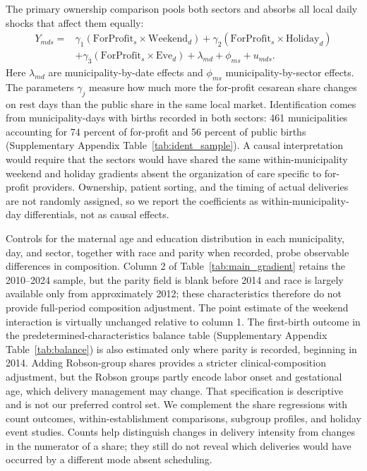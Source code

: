 \documentclass[12pt]{article}
\newcommand{\satab}[1]{Supplementary Appendix Table~\ref{#1}}
\begin{document}
The primary ownership comparison pools both sectors and absorbs all local daily shocks that affect them equally:
\begin{equation}
\begin{aligned}
Y_{mds}={}&\gamma_1(\mathrm{ForProfit}_s\times\mathrm{Weekend}_d)
+\gamma_2(\mathrm{ForProfit}_s\times\mathrm{Holiday}_d)\\
&+\gamma_3(\mathrm{ForProfit}_s\times\mathrm{Eve}_d)
+\lambda_{md}+\phi_{ms}+u_{mds}.
\end{aligned}
\label{eq:gradient}
\end{equation}
Here \(\lambda_{md}\) are municipality-by-date effects and \(\phi_{ms}\) municipality-by-sector effects. The parameters \(\gamma_j\) measure how much more the for-profit cesarean share changes on rest days than the public share in the same local market. Identification comes from municipality-days with births recorded in both sectors: 461 municipalities accounting for 74 percent of for-profit and 56 percent of public births (\satab{tab:ident_sample}). A causal interpretation would require that the sectors would have shared the same within-municipality weekend and holiday gradients absent the organization of care specific to for-profit providers. Ownership, patient sorting, and the timing of actual deliveries are not randomly assigned, so we report the coefficients as within-municipality-day differentials, not as causal effects.

Controls for the maternal age and education distribution in each municipality, day, and sector, together with race and parity when recorded, probe observable differences in composition. Column 2 of Table~\ref{tab:main_gradient} retains the 2010–2024 sample, but the parity field is blank before 2014 and race is largely available only from approximately 2012; these characteristics therefore do not provide full-period composition adjustment. The point estimate of the weekend interaction is virtually unchanged relative to column 1. The first-birth outcome in the predetermined-characteristics balance table (\satab{tab:balance}) is also estimated only where parity is recorded, beginning in 2014. Adding Robson-group shares provides a stricter clinical-composition adjustment, but the Robson groups partly encode labor onset and gestational age, which delivery management may change. That specification is descriptive and is not our preferred control set. We complement the share regressions with count outcomes, within-establishment comparisons, subgroup profiles, and holiday event studies. Counts help distinguish changes in delivery intensity from changes in the numerator of a share; they still do not reveal which deliveries would have occurred by a different mode absent scheduling.
\end{document}
